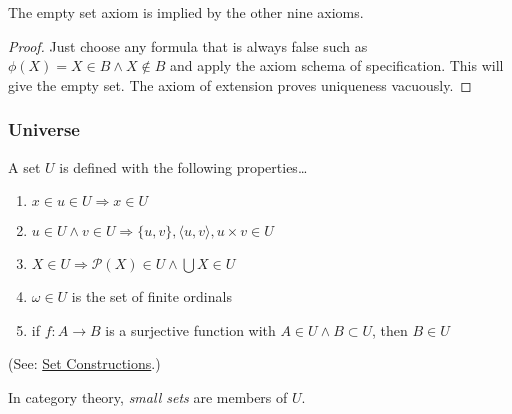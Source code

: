\begin{proposition}
	The empty set axiom is implied by the other nine axioms.
\end{proposition}

\begin{proof}
	Just choose any formula that is always false such as $\phi(X) = X \in B \land X \not \in B$ and apply the axiom schema of specification. This
	will give the empty set. The axiom of extension proves uniqueness vacuously.
\end{proof}

\subsubsection{Universe}\label{universe}
A set $U$ is defined with the following properties\dots
\begin{enumerate}
  \item $x \in u \in U \Rightarrow x \in U$
  \item $u \in U \land v \in U \Rightarrow \{u,v\}, \langle u,v \rangle, u \times v \in U$
  \item $X \in U \Rightarrow \mathcal{P}(X) \in U \land \bigcup X \in U$
  \item $\omega \in U$ is the set of finite ordinals
  \item if $f:A \rightarrow B$ is a surjective function with $A \in U \land B \subset U$, then $B \in U$
\end{enumerate}

(See: \hyperref[setconstructions]{Set Constructions}.)\newline

\noindent In category theory, \emph{small sets} are members of $U$. \label{smallsets}